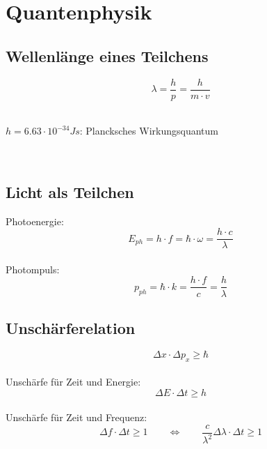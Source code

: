



\chapter{Quantenphysik}

\section{Wellenlänge eines Teilchens}
\[\boxed{
	\lambda = \frac{h}{p} = \frac{h}{m \cdot v}
}\]
\\
\begin{footnotesize}
	$h = 6.63 \cdot 10^{-34}Js$: Plancksches Wirkungsquantum 
\end{footnotesize}
\\

\section{Licht als Teilchen}
Photoenergie:
\[\boxed{
	E_{ph} = h \cdot f = \hbar \cdot \omega = \frac{h \cdot c}{\lambda}
}\]
\\
Photompuls:
\[\boxed{
	p_{ph} = \hbar \cdot k = \frac{h \cdot f}{c} = \frac{h}{\lambda}
}\]

\section{Unschärferelation}
\[\boxed{
	\Delta x \cdot \Delta p_x \ge \hbar
}\]
\\
Unschärfe für Zeit und Energie:
\[\boxed{
	\Delta E \cdot \Delta t \ge h
}\]
\\
Unschärfe für Zeit und Frequenz:
\[\boxed{
	\Delta f \cdot \Delta t \ge 1 \qquad \Leftrightarrow \qquad \frac{c}{\lambda^2} \Delta \lambda \cdot \Delta t \ge 1
}\]
\\

